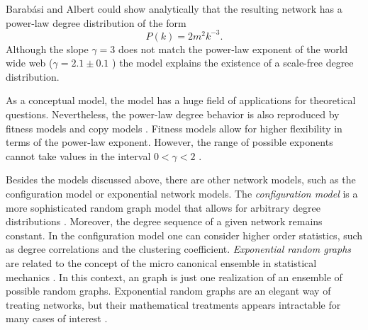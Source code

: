 Barab\'asi and Albert could show analytically that the resulting network has a power-law degree distribution of the form
\begin{equation}\label{eq:BA_law}
P(k)=2m^2 k^{-3}.
\end{equation}
Although the slope $\gamma = 3$ does not match the power-law exponent of the world wide web ($\gamma = 2.1\pm 0.1$ \citep{Barabasi99}) the model explains the existence of a scale-free degree distribution.

As a conceptual model, the \BA model has a huge field of applications for theoretical questions.
Nevertheless, the power-law degree behavior is also reproduced by fitness models \citep{Bianconi:2001,Fortunato:2006} and copy models \citep{Kleinberg99theweb}.
Fitness models allow for higher flexibility in terms of the power-law exponent.
However, the range of possible exponents cannot take values in the interval $0<\gamma < 2$ \citep{all_scale_free_are_sparse}.

Besides the models discussed above, there are other network models, such as the configuration model or exponential network models. 
The \emph{configuration model} is a more sophisticated random graph model that allows for arbitrary degree distributions \citep{Newman:book,Newman:2001pa}.
Moreover, the degree sequence of a given network remains constant.
In the configuration model one can consider higher order statistics, such as degree correlations and the clustering coefficient.
\emph{Exponential random graphs} are related to the concept of the micro canonical ensemble in statistical mechanics \citep{Strauss:86}.
In this context, an \ER graph is just one realization of an ensemble of possible random graphs.
Exponential random graphs are an elegant way of treating networks, but their mathematical treatments appears intractable for many cases of interest \citep{Newman2003}.

